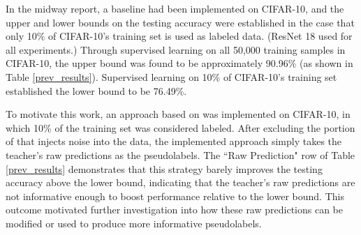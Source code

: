 \documentclass{article}
\begin{document}
In the midway report, a baseline had been implemented on CIFAR-10, and the upper and lower bounds on the testing accuracy were established in the case that only 10\% of CIFAR-10's training set is used as labeled data. (ResNet 18 used for all experiments.) Through supervised learning on all 50,000 training samples in CIFAR-10, the upper bound was found to be approximately 90.96\% (as shown in Table \ref{prev_results}). Supervised learning on 10\% of CIFAR-10's training set established the lower bound to be 76.49\%.

To motivate this work, an approach based on \cite{xie2019selftraining} was implemented on CIFAR-10, in which 10\% of the training set was considered labeled. After excluding the portion of \cite{xie2019selftraining} that injects noise into the data, the implemented approach simply takes the teacher's raw predictions as the pseudolabels. The ``Raw Prediction" row of Table \ref{prev_results} demonstrates that this strategy barely improves the testing accuracy above the lower bound, indicating that the teacher's raw predictions are not informative enough to boost performance relative to the lower bound. This outcome motivated further investigation into how these raw predictions can be modified or used to produce more informative pseudolabels.
\end{document}
